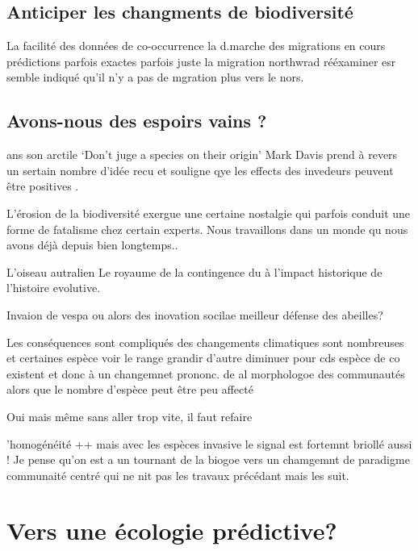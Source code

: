 \subsection*{Anticiper les changments de
biodiversité}\label{anticiper-les-changments-de-biodiversituxe9}

La facilité des données de co-occurrence la d.marche des migrations en
cours prédictions parfois exactes parfois juste la migration northwrad
rééxaminer esr semble indiqué qu'il n'y a pas de mgration plus vers le
nors.

\subsection*{Avons-nous des espoirs vains
?}\label{avons-nous-des-espoirs-vains}

ans son arctile `Don't juge a species on their origin' Mark Davis prend
à revers un sertain nombre d'idée recu et souligne qye les effects des
invedeurs peuvent être positives \citet{Davis2011}.

L'érosion de la biodiversité exergue une certaine nostalgie qui parfois
conduit une forme de fatalisme chez certain experts. Nous travaillons
dans un monde qu nous avons déjà depuis bien longtemps..

L'oiseau autralien Le royaume de la contingence du à l'impact historique
de l'histoire evolutive.

Invaion de vespa ou alors des inovation socilae meilleur défense des
abeilles?

Les conséquences sont compliqués des changements climatiques sont
nombreuses et certaines espèce voir le range grandir d'autre diminuer
pour cds espèce de co existent et donc à un changemnet prononc. de al
morphologoe des communautés alors que le nombre d'espèce peut être peu
affecté \citet{Moritz2008}

Oui mais même sans aller trop vite, il faut refaire

'homogénéité ++ mais avec les espèces invasive le signal est fortemnt
briollé aussi ! Je pense qu'on est a un tournant de la biogoe vers un
chamgemnt de paradigme communaité centré qui ne nit pas les travaux
précédant mais les suit.

\section*{Vers une écologie
prédictive?}\label{vers-une-uxe9cologie-pruxe9dictive}

